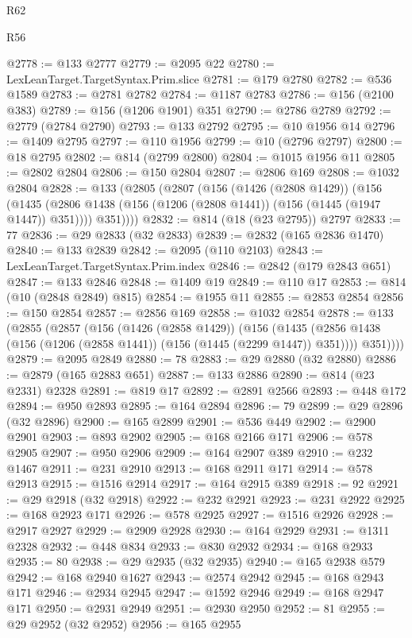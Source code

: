 \begin{lexlean}{R62}
\begin{lexlean}{R56}
\begin{coremodule}
{{{{{{{{{{{{{{{{{{{{{{{{{{{{{{{{{{{{{{{{{{{{{{{{{{{{{{{{{{{{{{{{{{{{{{{{{{{{{{{{{{{{{{{{{{{{{{{{{{{{{{{{{{{{{{{{{{{{{{{{{{{{{{{{{{{{{{{{{{{{{{{{{{{{{{{{{{{{{{{{{{{{{{{{{{{{{{{{{{{{{{{{{{{{{{{{{{{{{{{{{{{{{{{{{{{@2778 := @133 @2777
@2779 := @2095 @22
@2780 := LexLeanTarget.TargetSyntax.Prim.slice
@2781 := @179 @2780
@2782 := @536 @1589
@2783 := @2781 @2782
@2784 := @1187 @2783
@2786 := @156 (@2100 @383)
@2789 := @156 (@1206 @1901) @351
@2790 := @2786 @2789
@2792 := @2779 (@2784 @2790)
@2793 := @133 @2792
@2795 := @10 @1956 @14
@2796 := @1409 @2795
@2797 := @110 @1956
@2799 := @10 (@2796 @2797)
@2800 := @18 @2795
@2802 := @814 (@2799 @2800)
@2804 := @1015 @1956 @11
@2805 := @2802 @2804
@2806 := @150 @2804
@2807 := @2806 @169
@2808 := @1032 @2804
@2828 := @133
    (@2805
      (@2807
        (@156
          (@1426 (@2808 @1429))
          (@156
            (@1435 (@2806 @1438 (@156 (@1206 (@2808 @1441)) (@156 (@1445 (@1947 @1447)) @351))))
            @351))))
@2832 := @814 (@18 (@23 @2795)) @2797
@2833 := 77
@2836 := @29 @2833 (@32 @2833)
@2839 := @2832 (@165 @2836 @1470)
@2840 := @133 @2839
@2842 := @2095 (@110 @2103)
@2843 := LexLeanTarget.TargetSyntax.Prim.index
@2846 := @2842 (@179 @2843 @651)
@2847 := @133 @2846
@2848 := @1409 @19
@2849 := @110 @17
@2853 := @814 (@10 (@2848 @2849) @815)
@2854 := @1955 @11
@2855 := @2853 @2854
@2856 := @150 @2854
@2857 := @2856 @169
@2858 := @1032 @2854
@2878 := @133
    (@2855
      (@2857
        (@156
          (@1426 (@2858 @1429))
          (@156
            (@1435 (@2856 @1438 (@156 (@1206 (@2858 @1441)) (@156 (@1445 (@2299 @1447)) @351))))
            @351))))
@2879 := @2095 @2849
@2880 := 78
@2883 := @29 @2880 (@32 @2880)
@2886 := @2879 (@165 @2883 @651)
@2887 := @133 @2886
@2890 := @814 (@23 @2331) @2328
@2891 := @819 @17
@2892 := @2891 @2566
@2893 := @448 @172
@2894 := @950 @2893
@2895 := @164 @2894
@2896 := 79
@2899 := @29 @2896 (@32 @2896)
@2900 := @165 @2899
@2901 := @536 @449
@2902 := @2900 @2901
@2903 := @893 @2902
@2905 := @168 @2166 @171
@2906 := @578 @2905
@2907 := @950 @2906
@2909 := @164 @2907 @389
@2910 := @232 @1467
@2911 := @231 @2910
@2913 := @168 @2911 @171
@2914 := @578 @2913
@2915 := @1516 @2914
@2917 := @164 @2915 @389
@2918 := 92
@2921 := @29 @2918 (@32 @2918)
@2922 := @232 @2921
@2923 := @231 @2922
@2925 := @168 @2923 @171
@2926 := @578 @2925
@2927 := @1516 @2926
@2928 := @2917 @2927
@2929 := @2909 @2928
@2930 := @164 @2929
@2931 := @1311 @2328
@2932 := @448 @834
@2933 := @830 @2932
@2934 := @168 @2933
@2935 := 80
@2938 := @29 @2935 (@32 @2935)
@2940 := @165 @2938 @579
@2942 := @168 @2940 @1627
@2943 := @2574 @2942
@2945 := @168 @2943 @171
@2946 := @2934 @2945
@2947 := @1592 @2946
@2949 := @168 @2947 @171
@2950 := @2931 @2949
@2951 := @2930 @2950
@2952 := 81
@2955 := @29 @2952 (@32 @2952)
@2956 := @165 @2955
}}}}}}}}}}}}}}}}}}}}}}}}}}}}}}}}}}}}}}}}}}}}}}}}}}}}}}}}}}}}}}}}}}}}}}}}}}}}}}}}}}}}}}}}}}}}}}}}}}}}}}}}}}}}}}}}}}}}}}}}}}}}}}}}}}}}}}}}}}}}}}}}}}}}}}}}}}}}}}}}}}}}}}}}}}}}}}}}}}}}}}}}}}}}}}}}}}}}}}}}}}}}}}}}}}}
\end{coremodule}
\end{lexlean}
\end{lexlean}
